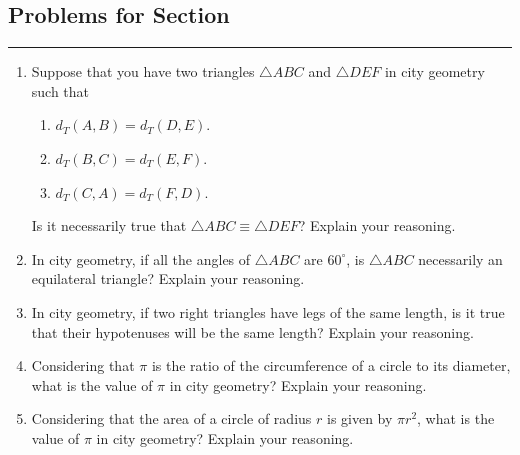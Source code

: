 \subsection*{Problems for Section~\thesection}\hrule\vspace{1ex}
\begin{enumerate}
\item Suppose that you have two triangles $\triangle ABC$ and $\triangle DEF$ in  city geometry such that
\begin{enumerate}
\item $d_T(A,B) = d_T(D,E)$.
\item $d_T(B,C) = d_T(E,F)$.
\item $d_T(C,A) = d_T(F,D)$.
\end{enumerate} 
Is it necessarily true that $\triangle ABC \equiv \triangle DEF$? Explain your reasoning.
\item In city geometry, if all the angles of $\triangle ABC$ are
  $60^\circ$, is $\triangle ABC$ necessarily an equilateral triangle?
  Explain your reasoning.
\item In city geometry, if two right triangles have legs of the same
  length, is it true that their hypotenuses will be the same length?
  Explain your reasoning.
\item Considering that $\pi$ is the ratio of the circumference of a
  circle to its diameter, what is the value of $\pi$ in city geometry?
  Explain your reasoning.

\item Considering that the area of a circle of radius $r$ is given by
  $\pi r^2$, what is the value of $\pi$ in city geometry? Explain your
  reasoning.


\end{enumerate}
